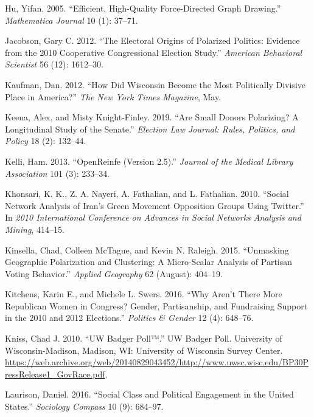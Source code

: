 \documentclass[12pt,]{article}
\begin{document}
\leavevmode\hypertarget{ref-yifanhu}{}%
Hu, Yifan. 2005. ``Efficient, High-Quality Force-Directed Graph
Drawing.'' \emph{Mathematica Journal} 10 (1): 37--71.

\leavevmode\hypertarget{ref-jacobson2012}{}%
Jacobson, Gary C. 2012. ``The Electoral Origins of Polarized Politics:
Evidence from the 2010 Cooperative Congressional Election Study.''
\emph{American Behavioral Scientist} 56 (12): 1612--30.

\leavevmode\hypertarget{ref-kaufman2012}{}%
Kaufman, Dan. 2012. ``How Did Wisconsin Become the Most Politically
Divisive Place in America?'' \emph{The New York Times Magazine}, May.

\leavevmode\hypertarget{ref-keena2019}{}%
Keena, Alex, and Misty Knight-Finley. 2019. ``Are Small Donors
Polarizing? A Longitudinal Study of the Senate.'' \emph{Election Law
Journal: Rules, Politics, and Policy} 18 (2): 132--44.

\leavevmode\hypertarget{ref-openrefine}{}%
Kelli, Ham. 2013. ``OpenReinfe (Version 2.5).'' \emph{Journal of the
Medical Library Association} 101 (3): 233--34.

\leavevmode\hypertarget{ref-khonsari2010}{}%
Khonsari, K. K., Z. A. Nayeri, A. Fathalian, and L. Fathalian. 2010.
``Social Network Analysis of Iran's Green Movement Opposition Groups
Using Twitter.'' In \emph{2010 International Conference on Advances in
Social Networks Analysis and Mining}, 414--15.

\leavevmode\hypertarget{ref-kinsella2015}{}%
Kinsella, Chad, Colleen McTague, and Kevin N. Raleigh. 2015. ``Unmasking
Geographic Polarization and Clustering: A Micro-Scalar Analysis of
Partisan Voting Behavior.'' \emph{Applied Geography} 62 (August):
404--19.

\leavevmode\hypertarget{ref-kitchens2016}{}%
Kitchens, Karin E., and Michele L. Swers. 2016. ``Why Aren't There More
Republican Women in Congress? Gender, Partisanship, and Fundraising
Support in the 2010 and 2012 Elections.'' \emph{Politics \& Gender} 12
(4): 648--76.

\leavevmode\hypertarget{ref-uwsc}{}%
Kniss, Chad J. 2010. ``UW Badger Poll™.'' UW Badger Poll. University of
Wisconsin-Madison, Madison, WI: University of Wisconsin Survey Center.
\url{https://web.archive.org/web/20140829043452/http://www.uwsc.wisc.edu/BP30PressRelease1_GovRace.pdf}.

\leavevmode\hypertarget{ref-laurison2016}{}%
Laurison, Daniel. 2016. ``Social Class and Political Engagement in the
United States.'' \emph{Sociology Compass} 10 (9): 684--97.
\end{document}
